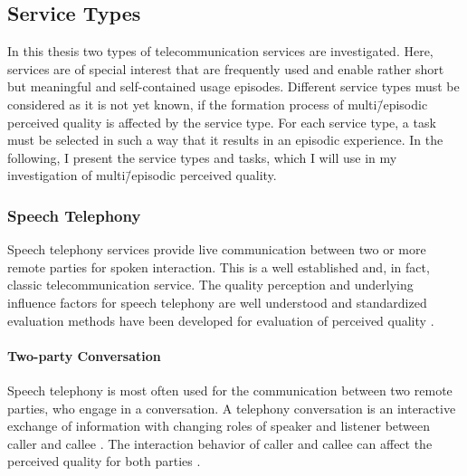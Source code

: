 \subsection{Service Types}
In this thesis two types of telecommunication services are investigated.
Here, services are of special interest that are frequently used and enable rather short but meaningful and self-contained usage episodes.
Different service types must be considered as it is not yet known, if the formation process of multi\=/episodic perceived quality is affected by the service type.
For each service type, a task must be selected in such a way that it results in an episodic experience.
In the following, I present the service types and tasks, which I will use in my investigation of multi\=/episodic perceived quality.

\subsubsection*{Speech Telephony}\label{method:sct}
Speech telephony services provide live communication between two or more remote parties for spoken interaction.
This is a well established and, in fact, classic telecommunication service.
The quality perception and underlying influence factors for speech telephony are well understood and standardized evaluation methods have been developed for evaluation of perceived quality \citep[\eg,][]{itu_handbook_1992}.

\paragraph*{Two-party Conversation}
Speech telephony is most often used for the communication between two remote parties, who engage in a conversation.
A telephony conversation is an interactive exchange of information with changing roles of speaker and listener between caller and callee \citep[][]{hopper_telephone_1992}.
The interaction behavior of caller and callee can affect the perceived quality for both parties \citep[\eg,][]{schoenenberg_why_2014, egger_it_2010}.

